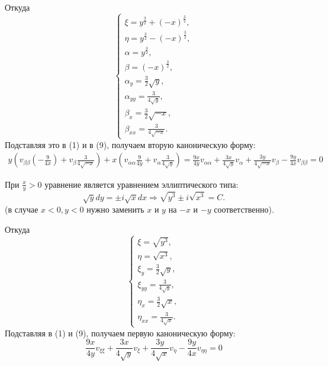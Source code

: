 \documentclass[11pt]{article}
\begin{document}
Откуда
\begin{equation}
\begin{cases}
\xi = y^{\frac32} + (-x)^{\frac32}, \\
\eta = y^{\frac32} - (-x)^{\frac32}, \\
\alpha = y^{\frac32}, \\
\beta = (-x)^{\frac32}, \\
\alpha_y = \frac32\sqrt{y}, \\
\alpha_{yy} = \frac3{4\sqrt{y}}, \\
\beta_x = \frac32\sqrt{-x}, \\
\beta_{xx} = \frac3{4\sqrt{-x}}.
\end{cases}
\end{equation}
Подставляя это в (1) и в (9), получаем вторую каноническую форму:
\begin{multline}
y\left(v_{\beta\beta}\left(-\frac{9}{4x}\right) + v_{\beta}\frac3{4\sqrt{-x}}\right) +
x\left(v_{\alpha\alpha}\frac{9}{4y} + v_{\alpha}\frac3{4\sqrt{y}}\right) =
\frac{9x}{4y}v_{\alpha\alpha} + \frac{3x}{4\sqrt{y}}v_{\alpha} + \frac{3y}{4\sqrt{-x}}v_{\beta} -
\frac{9y}{4x}v_{\beta\beta} = 0
\end{multline}

При $\frac{x}y > 0$ уравнение является уравнением эллиптического типа:
\begin{equation*}
\sqrt{y}dy = \pm i\sqrt{x}dx \Rightarrow \sqrt{y^3} \pm i\sqrt{x^3} = C.
\end{equation*}
(в случае $x < 0, y < 0$ нужно заменить $x$ и $y$ на $-x$ и $-y$ соответственно).

Откуда
\begin{equation}
\begin{cases}
\xi = \sqrt{y^3}, \\
\eta = \sqrt{x^3}, \\
\xi_y = \frac3{2}\sqrt{y}, \\
\xi_{yy} = \frac3{4\sqrt{y}}, \\
\eta_x = \frac3{2}\sqrt{x}, \\
\eta_{xx} = \frac3{4\sqrt{x}}.
\end{cases}
\end{equation}
Подставляя в (1) и (9), получаем первую каноническую форму:
\begin{equation}
\frac{9x}{4y}v_{\xi\xi} + \frac{3x}{4\sqrt{y}}v_{\xi} + \frac{3y}{4\sqrt{x}}v_{\eta} - \frac{9y}{4x}v_{\eta\eta} = 0
\end{equation}
\end{document}
